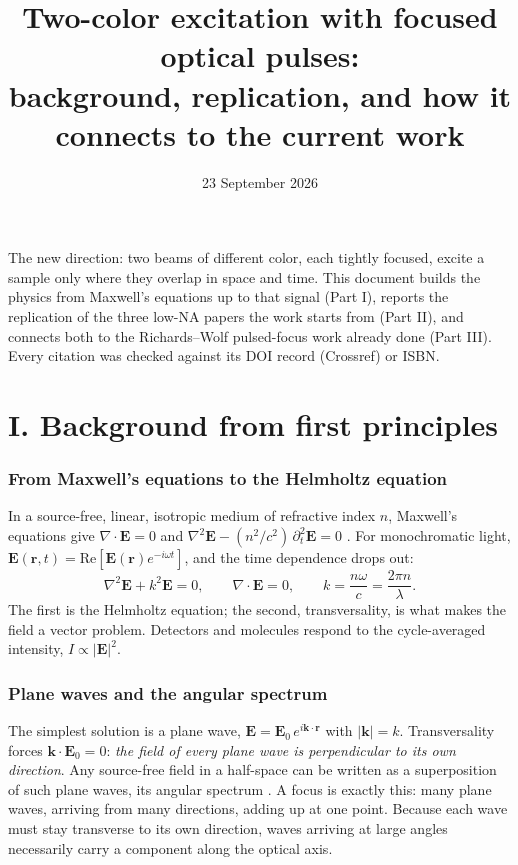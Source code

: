 \documentclass[11pt]{article}
\title{Two-color excitation with focused optical pulses:\\ background, replication, and how it connects to the current work}
\date{23 September 2026}
\author{}
\begin{document}
\maketitle
\vspace{-2.5em}

\noindent The new direction: two beams of different color, each tightly focused, excite a sample only where
they overlap in space and time. This document builds the physics from Maxwell's equations up to that
signal (Part I), reports the replication of the three low-NA papers the work starts from (Part II), and
connects both to the Richards--Wolf pulsed-focus work already done (Part III). Every citation was checked
against its DOI record (Crossref) or ISBN.

\part*{I. Background from first principles}

\section{From Maxwell's equations to the Helmholtz equation}
In a source-free, linear, isotropic medium of refractive index $n$, Maxwell's equations give
$\nabla\cdot\mathbf E=0$ and $\nabla^2\mathbf E-(n^2/c^2)\,\partial_t^2\mathbf E=0$
\cite{BornWolf, NovotnyHecht}. For monochromatic light,
$\mathbf E(\mathbf r,t)=\mathrm{Re}[\mathbf E(\mathbf r)e^{-i\omega t}]$, and the time dependence drops out:
\[
\nabla^2\mathbf E+k^2\mathbf E=0,\qquad \nabla\cdot\mathbf E=0,\qquad k=\frac{n\omega}{c}=\frac{2\pi n}{\lambda}.
\]
The first is the Helmholtz equation; the second, transversality, is what makes the field a vector problem.
Detectors and molecules respond to the cycle-averaged intensity, $I\propto|\mathbf E|^2$.

\section{Plane waves and the angular spectrum}
The simplest solution is a plane wave, $\mathbf E=\mathbf E_0\,e^{i\mathbf k\cdot\mathbf r}$ with
$|\mathbf k|=k$. Transversality forces $\mathbf k\cdot\mathbf E_0=0$: \emph{the field of every plane wave is
perpendicular to its own direction}. Any source-free field in a half-space can be written as a superposition of
such plane waves, its angular spectrum \cite{Goodman, NovotnyHecht}. A focus is exactly this: many plane waves,
arriving from many directions, adding up at one point. Because each wave must stay transverse to its own
direction, waves arriving at large angles necessarily carry a component along the optical axis.
\end{document}
